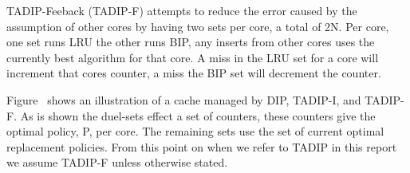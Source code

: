 TADIP-Feeback (TADIP-F) attempts to reduce the error caused by the assumption of other cores by having two sets per core, a total of 2N.
Per core, one set runs LRU the other runs BIP, any inserts from other cores uses the currently best algorithm for that core.
A miss in the LRU set for a core will increment that cores counter, a miss the BIP set will decrement the counter.


Figure~ shows an illustration of a cache managed by DIP, TADIP-I, and TADIP-F. 
As is shown the duel-sets effect a set of counters, these counters give the optimal policy, P, per core. 
The remaining sets use the set of current optimal replacement policies.
From this point on when we refer to TADIP in this report we assume TADIP-F unless otherwise stated.


